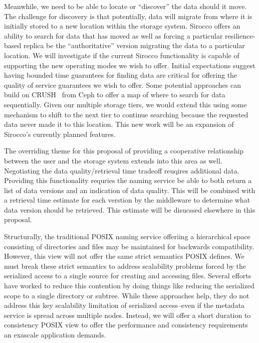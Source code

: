 Meanwhile, we need to be able to locate or ``discover'' the data should it
move.  The challenge for discovery is that potentially, data will migrate from
where it is initially stored to a new location within the storage system.
Sirocco offers an ability to search for data that has moved as well as forcing
a particular resilience-based replica be the ``authoritative'' version
migrating the data to a particular location. We will investigate if the current
Sirocco functionality is capable of supporting the new operating modes we wish
to offer. Initial expectations suggest having bounded time guarantees for
finding data are critical for offering the quality of service guarantees we
wish to offer. Some potential approaches can build on CRUSH~\cite{ceph} from
Ceph to offer a map of where to search for data sequentially. Given our
multiple storage tiers, we would extend this using some mechanism to shift to
the next tier to continue searching because the requested data never made it to
this location. This new work will be an expansion of Sirocco's currently
planned features.

The overriding theme for this proposal of providing a cooperative relationship
between the user and the storage system extends into this area as well.
Negotiating the data quality/retrieval time tradeoff reuqires additional data.
Providing this functionality requries the naming service be able to both return
a list of data versions and an indication of data quality. This will be
combined with a retrieval time estimate for each verstion by the middleware to
determine what data version should be retrieved.  This estimate will be
disucssed elsewhere in this proposal.

Structurally, the traditional POSIX naming service offeriing a hierarchical
space consisting of directories and files may be maintained for backwards
compatibility. However, this view will not offer the same strict semantics
POSIX defines. We must break these strict semantics to address scalability
problems forced by the serialized access to a single source for creating and
accessing files.  Several efforts~\cite{giga+,pvfs,others} have worked to
reduce this contention by doing things like reducing the serialized scope to a
single directory or subtree. While these approaches help, they do not address
this key scalability limitation of serialized access--even if the metadata
service is spread across multiple nodes. Instead, we will offer a
short duration to consistency POSIX view to offer the performance and
consistency requirements an exascale application demands.

